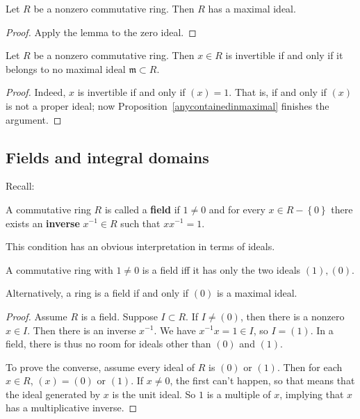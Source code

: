 \begin{corollary} 
Let $R $ be a nonzero commutative ring.  Then $R$ has a maximal ideal.
\end{corollary} 
\begin{proof} 
Apply the lemma to the zero ideal.  
\end{proof} 

\begin{corollary} 
Let $R$ be a nonzero commutative ring. Then $x \in R$ is invertible if and
only if it belongs to no maximal ideal $\mathfrak{m} \subset R$.
\end{corollary} 
\begin{proof} 
Indeed, $x$ is invertible if and only if $(x) = 1$. That is, if and only if
$(x)$ is not a proper ideal; now Proposition~\ref{anycontainedinmaximal}
finishes the argument.
\end{proof} 

\subsection{Fields and integral domains}

Recall:

\begin{definition} 
A commutative ring $R$ is called a  \textbf{field} if $1 \neq 0$ and for every $x \in R -
\left\{0\right\}$ there exists an \textbf{inverse} $x^{-1} \in R$ such that $xx^{-1} =
1$.


\end{definition}


This condition has an obvious interpretation in terms of ideals.
\begin{proposition} 
A commutative ring with $1 \neq 0$ is a field iff it has only the two ideals $(1),
(0)$.
\end{proposition} 

Alternatively, a ring is a field if and only if $(0)$ is a maximal ideal.

\begin{proof} 
Assume $R$ is a field.  Suppose $I \subset R$.  If $I \neq (0)$, then there is
a nonzero $x \in I$. Then there is an inverse $x^{-1}$. We have $x^{-1} x =1
\in I$, so $I = (1)$.
In a field, there is thus 	no room for ideals other than $(0)$ and $(1)$.

To prove the converse, assume every ideal of $R$ is $(0)$ or $(1)$. Then for
each $x \in R$, $(x) = (0)$ or $(1)$. If $x \neq 0$, the first can't happen, so
that means that the ideal generated by $x$ is the unit ideal. So $1$ is a
multiple of $x$, implying that $x$ has a multiplicative inverse.
\end{proof} 

